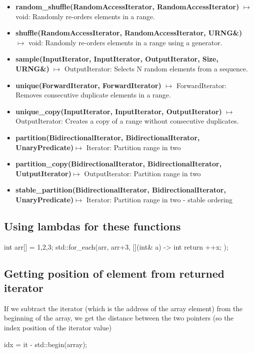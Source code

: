 \documentclass{report}
\begin{document}
\begin{itemize}
    \item \textbf{random\_shuffle(RandomAccessIterator, RandomAccessIterator)} \(\mapsto\) void: Randomly re-orders elements in a range.
    \item \textbf{shuffle(RandomAccessIterator, RandomAccessIterator, URNG\&)} \(\mapsto\) void: Randomly re-orders elements in a range using a generator.
    \item \textbf{sample(InputIterator, InputIterator, OutputIterator, Size, URNG\&)} \(\mapsto\) OutputIterator: Selects N random elements from a sequence.
    \item \textbf{unique(ForwardIterator, ForwardIterator)} \(\mapsto\) ForwardIterator: Removes consecutive duplicate elements in a range.
    \item \textbf{unique\_copy(InputIterator, InputIterator, OutputIterator)} \(\mapsto\) OutputIterator: Creates a copy of a range without consecutive duplicates.
    \item \textbf{partition(BidirectionalIterator, BidirectionalIterator, UnaryPredicate)}$\mapsto$ Iterator: Partition range in two
    \item \textbf{partition\_copy(BidirectionalIterator, BidirectionalIterator, UutputIterator)}$\mapsto $ OutputIterator: Partition range in two
    \item \textbf{stable\_partition(BidirectionalIterator, BidirectionalIterator, UnaryPredicate)}$\mapsto $ Iterator: Partition range in two - stable ordering 
    \end{itemize}
    
    \bigbreak \noindent 
    \subsection{Using lambdas for these functions}
    \bigbreak \noindent 
    \begin{cppcode}
        int arr[]  = {1,2,3};
        std::for_each(arr, arr+3, [](int& a) -> int { return ++x; });
    \end{cppcode}

    \bigbreak \noindent 
    \subsection{Getting position of element from returned iterator}
    \bigbreak \noindent 
    \begin{concept}
        If we subtract the iterator (which is the address of the array element) from the beginning of the array, we get the distance between the two pointers (so the index position of the iterator value) 
        \bigbreak \noindent 
        \begin{cppcode}
        idx = it - std::begin(array);
        \end{cppcode}
    \end{concept}
\end{document}
